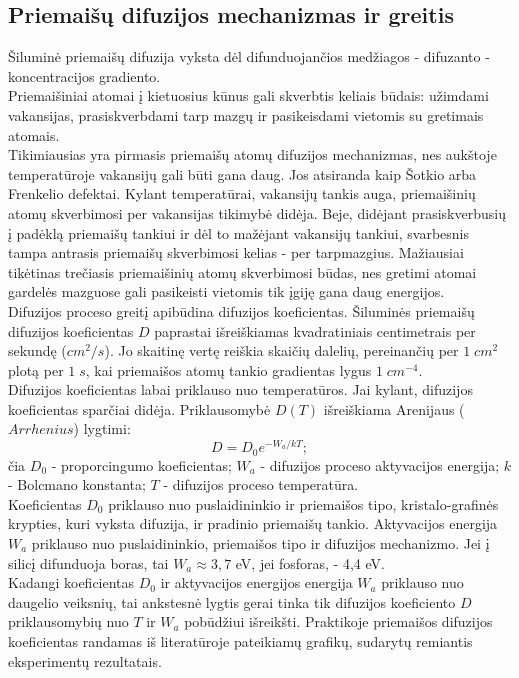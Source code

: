 \documentclass[11pt,a4paper]{article}
\begin{document}
\subsection{Priemaišų difuzijos mechanizmas ir greitis}
Šiluminė priemaišų difuzija vyksta dėl difunduojančios medžiagos - difuzanto - koncentracijos gradiento.\\
Priemaišiniai atomai į kietuosius kūnus gali skverbtis keliais būdais: užimdami vakansijas, prasiskverbdami tarp mazgų ir pasikeisdami vietomis su gretimais atomais.\\
Tikimiausias yra pirmasis priemaišų atomų difuzijos mechanizmas, nes aukštoje temperatūroje vakansijų gali būti gana daug. 
Jos atsiranda kaip Šotkio arba Frenkelio defektai. Kylant temperatūrai, vakansijų tankis auga, priemaišinių atomų skverbimosi per 
vakansijas tikimybė didėja. Beje, didėjant prasiskverbusių į padėklą priemaišų tankiui ir dėl to mažėjant vakansijų tankiui, svarbesnis 
tampa antrasis priemaišų skverbimosi kelias - per tarpmazgius. Mažiausiai tikėtinas trečiasis priemaišinių atomų skverbimosi būdas, nes 
gretimi atomai gardelės mazguose gali pasikeisti vietomis tik įgiję gana daug energijos.\\
Difuzijos proceso greitį apibūdina difuzijos koeficientas. Šiluminės priemaišų difuzijos koeficientas $D$ paprastai išreiškiamas 
kvadratiniais centimetrais per sekundę ($cm^2/s$). Jo skaitinę vertę reiškia skaičių dalelių, pereinančių per $1\;cm^2$ plotą 
per $1\;s$, kai priemaišos atomų tankio gradientas lygus $1\;cm^{-4}$.\\
Difuzijos koeficientas labai priklauso nuo temperatūros. Jai kylant, difuzijos koeficientas sparčiai didėja. 
Priklausomybė $D(T)$ išreiškiama Arenijaus ($Arrhenius$) lygtimi:\\
\begin{equation}
  D = D_0 e^{-W_a/kT};
\end{equation}
čia $D_0$ - proporcingumo koeficientas; $W_a$ - difuzijos proceso aktyvacijos energija; $k$ - Bolcmano konstanta; $T$ - difuzijos proceso temperatūra.\\
Koeficientas $D_0$ priklauso nuo puslaidininkio ir priemaišos tipo, kristalo-grafinės krypties, 
kuri vyksta difuzija, ir pradinio priemaišų tankio. Aktyvacijos energija $W_a$ priklauso nuo puslaidininkio, 
priemaišos tipo ir difuzijos mechanizmo. Jei į silicį difunduoja boras, tai $W_a \approx 3,7$ eV, jei fosforas, - 4,4 eV.\\
Kadangi koeficientas $D_0$ ir aktyvacijos energijos energija $W_a$ priklauso nuo daugelio veiksnių, 
tai ankstesnė lygtis gerai tinka tik difuzijos koeficiento $D$ priklausomybių nuo $T$ ir $W_a$ pobūdžiui išreikšti. 
Praktikoje priemaišos difuzijos koeficientas randamas iš literatūroje pateikiamų grafikų, sudarytų remiantis eksperimentų rezultatais.
\end{document}
